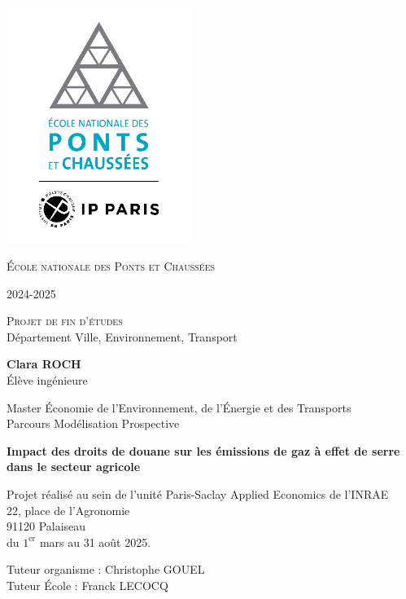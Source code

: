 \begin{titlepage}
    \vspace*{-2.5cm}
    \begin{center}
        \includegraphics[width=6cm]{logo_ponts.png}\par
        {\LARGE \textsc{École nationale des Ponts et Chaussées}\par}

        2024-2025

        \vspace{0.5cm}
        {\Large \textsc{Projet de fin d’études}} \\
        Département Ville, Environnement, Transport

        \vspace{0.5cm}
        {\large \textbf{Clara ROCH}} \\
        Élève ingénieure

        Master Économie de l’Environnement, de l’Énergie et des Transports \\
        Parcours Modélisation Prospective

        \vspace{0.5cm}
        {\LARGE \bfseries {Impact des droits de douane sur les émissions de gaz à effet de serre dans le secteur agricole} \par}

        \vspace{1cm}
        Projet réalisé au sein de l'unité Paris-Saclay Applied Economics de l'INRAE \\
        22, place de l'Agronomie \\
        91120 Palaiseau \\
        du $1^{\text{er}}$ mars au 31 août 2025.

        \vspace{1cm}
        {\large Tuteur organisme : Christophe GOUEL \\
            Tuteur École : Franck LECOCQ}

    \end{center}
\end{titlepage}
